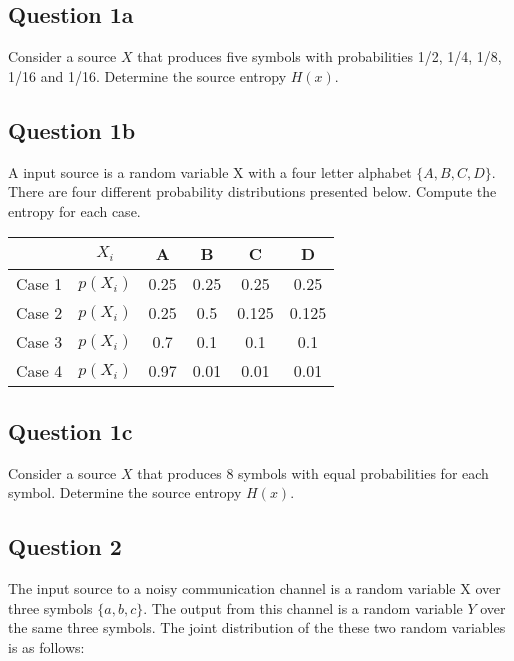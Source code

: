 \documentclass[a4paper,12pt]{article}
\begin{document}
\newpage
{}

\subsection*{Question 1a}
Consider a source $X$ that produces five symbols with probabilities 1/2, 1/4, 1/8, 1/16 and 1/16. Determine the source entropy $H(x)$. 

\subsection*{Question 1b}

A input source is a random variable X with a four letter alphabet $\{A,B,C,D\}$.
There are four different probability distributions presented below. Compute the entropy for each case.
\begin{center}
\begin{tabular}{|c c|c|c|c|c|}
\hline	&	$X_i$	&	A	&	B	&	C	&	D	\\ \hline
Case 1	&	$p(X_i)$	&	0.25	&	0.25	&	0.25	&	0.25	\\ \hline
Case 2	&	$p(X_i)$	&	0.25	&	0.5	&	0.125	&	0.125	\\ \hline
Case 3	&	$p(X_i)$	&	0.7	&	0.1	&	0.1	&	0.1	\\ \hline
Case 4	&	$p(X_i)$	&	0.97	&	0.01	&	0.01	&	0.01	\\ \hline
\end{tabular} 
\end{center}
\subsection*{Question 1c}
Consider a source $X$ that produces 8 symbols with equal probabilities for each symbol. Determine the source entropy $H(x)$. 


\subsection*{Question 2}

The input source to a noisy communication channel is a random variable X over three symbols $\{a,b,c\}$. The output from this channel is a random variable $Y$ over the same three symbols. The joint distribution of the these two random variables is as follows:
\end{document}
